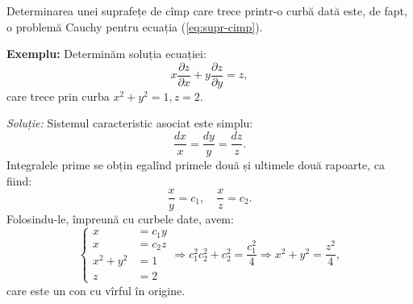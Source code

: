 \documentclass[11pt,a4paper]{article}
\theoremstyle{dotless}
\theoremstyle{dotlessdr}
\begin{document}
Determinarea unei suprafețe de cîmp care trece printr-o curbă dată este, de fapt, o problemă
Cauchy pentru ecuația (\ref{eq:supr-cimp}).

\vspace{1cm}

\textbf{Exemplu:} Determinăm soluția ecuației:
\[
  x \frac{\partial z}{\partial x} + y \frac{\partial z}{\partial y} = z,
\]
care trece prin curba $ x^2 + y^2 = 1, z = 2 $.

\emph{Soluție:} Sistemul caracteristic asociat este simplu:
\[
  \frac{dx}{x} = \frac{dy}{y} = \frac{dz}{z}.
\]
Integralele prime se obțin egalînd primele două și ultimele două rapoarte, ca fiind:
\[
  \frac{x}{y} = c_1, \quad \frac{x}{z} = c_2.
\]
Folosindu-le, împreună cu curbele date, avem:
\[
  \begin{cases}
    x &= c_1 y \\
    x &= c_2 z \\
    x^2 + y^2 &= 1 \\
    z &= 2
  \end{cases} \Rightarrow c_1^2 c_2^2 + c_2^2 = %
  \frac{c_1^2}{4} \Rightarrow x^2 + y^2 = \frac{z^2}{4},
\]
care este un con cu vîrful în origine.





\end{document}
